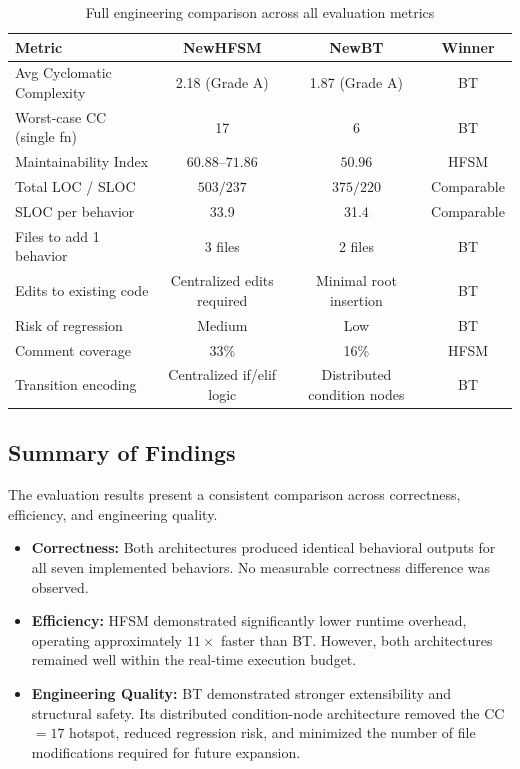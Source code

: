 \documentclass[12pt, a4paper]{report}
\begin{document}
\begin{table}[H]
\centering
\caption{Full engineering comparison across all evaluation metrics}
\label{tab:full_comparison}
\small
\setlength{\tabcolsep}{2.8pt}
\begin{tabular}{@{}p{3.8cm}ccc@{}}
\toprule
\textbf{Metric} & \textbf{NewHFSM} & \textbf{NewBT} & \textbf{Winner} \\
\midrule
Avg Cyclomatic Complexity & 2.18 (Grade A) & 1.87 (Grade A) & BT \\
Worst-case CC (single fn) & 17 & 6 & BT \\
Maintainability Index & $60.88$--$71.86$ & $50.96$ & HFSM \\
Total LOC / SLOC & $503 / 237$ & $375 / 220$ & Comparable \\
SLOC per behavior & 33.9 & 31.4 & Comparable \\
Files to add 1 behavior & 3 files & 2 files & BT \\
Edits to existing code & Centralized edits required & Minimal root insertion & BT \\
Risk of regression & Medium & Low & BT \\
Comment coverage & 33\% & 16\% & HFSM \\
Transition encoding & Centralized if/elif logic & Distributed condition nodes & BT \\
\bottomrule
\end{tabular}
\end{table}

\subsection{Summary of Findings}

The evaluation results present a consistent comparison across correctness, efficiency, and engineering quality.

\begin{itemize}
    \item \textbf{Correctness:} Both architectures produced identical behavioral outputs for all seven implemented behaviors. No measurable correctness difference was observed.
    \item \textbf{Efficiency:} HFSM demonstrated significantly lower runtime overhead, operating approximately $11\times$ faster than BT. However, both architectures remained well within the real-time execution budget.
    \item \textbf{Engineering Quality:} BT demonstrated stronger extensibility and structural safety. Its distributed condition-node architecture removed the CC$=17$ hotspot, reduced regression risk, and minimized the number of file modifications required for future expansion.
\end{itemize}
\end{document}
